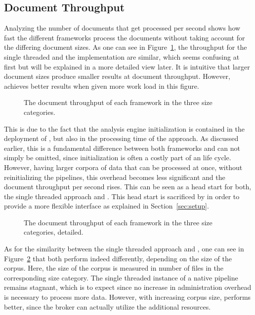 \subsection{Document Throughput}
Analyzing the number of documents that get processed per second shows how fast the different frameworks process the documents without taking account for the differing document sizes. As one can see in Figure~\ref{fig:result:throughput}, the throughput for the single threaded \uima{} and the \uimaas{} implementation are similar, which seems confusing at first but will be explained in a more detailed view later. It is intuitive that larger document sizes produce smaller results at document throughput. However, \spark{} achieves better results when given more work load in this figure.
\begin{figure}[!htb]
	\centering
	\resizebox{1.\linewidth}{!}{\small}
	\caption[The document throughput of each framework in the three size categories.]{The document throughput of each framework in the three size categories.}
	\label{fig:result:throughput}
\end{figure}
This is due to the fact that the analysis engine initialization is contained in the deployment of \uimaas{}, but also in the processing time of the \spark{} approach. As discussed earlier, this is a fundamental difference between both frameworks and can not simply be omitted, since initialization is often a costly part of an \anen{} life cycle. However, having larger corpora of data that can be processed at once, without reinitializing the pipelines, this overhead becomes less significant and the document throughput per second rises. This can be seen as a head start for both, the single threaded approach and \uimaas{}. This head start is sacrificed by \spark{} in order to provide a more flexible interface as explained in Section~\ref{sec:setup}.
\begin{figure}[htb]
	\centering
	\resizebox{1.\linewidth}{!}{\small}
	\caption{The document throughput of each framework in the three size categories, detailed.}
	\label{fig:result:throughput_det}
\end{figure}
As for the similarity between the single threaded approach and \uimaas{}, one can see in Figure~\ref{fig:result:throughput_det} that both perform indeed differently, depending on the size of the corpus. Here, the size of the corpus is measured in number of files in the corresponding size category. The single threaded instance of a native \uima{} pipeline remains stagnant, which is to expect since no increase in administration overhead is necessary to process more data. However, with increasing corpus size, \uimaas{} performs better, since the broker can actually utilize the additional resources.

